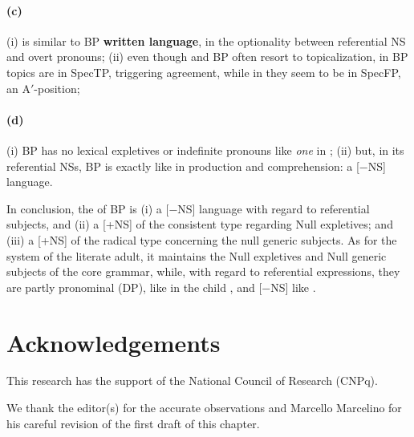 \documentclass[output=paper]{langsci/langscibook}
\begin{document}
\paragraph*{(c)} (i)   is similar to \gls{BP} \textbf{written language}, in the optionality between referential
NS and overt pronouns; (ii) even  though  and
\gls{BP} often resort to topicalization, in
\gls{BP} topics are in SpecTP, triggering agreement,
while in  they seem to be in SpecFP, an A$'$-position;

\paragraph*{(d)} (i) \gls{BP} has no lexical
expletives or indefinite  pronouns like \emph{one}  in ; (ii) but,
in its referential NSs, \gls{BP} is exactly like
 in production and comprehension: a [−NS] language.

In conclusion, the  of \gls{BP} is
(i) a [−NS] language with regard to referential subjects, and (ii) a [+NS] of
the consistent type regarding Null expletives; and (iii) a [+NS] of the
radical
type concerning the null generic subjects. As for the system of the literate
adult, it maintains the Null expletives and Null generic subjects of the core
grammar, while, with regard to referential expressions, they are partly
pronominal (DP), like in the child , and [−NS] like .

\printchapterglossary{}

\section*{Acknowledgements}

This research has the support of the National Council of Research (CNPq).

We thank the editor(s) for the accurate observations and Marcello Marcelino for
his careful revision of the first draft of this chapter.


{\sloppy
\printbibliography[heading=subbibliography,notkeyword=this]
}
\end{document}
